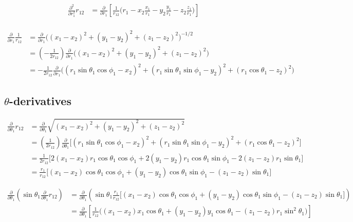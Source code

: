 \begin{align*}
    \frac{\partial^2}{\partial r_1^2} r_{12}
    &= \frac{\partial}{\partial r_1} \left[ \frac{1}{r_{12}} \Big( r_1 - x_2\frac{x_1}{r_1} - y_2\frac{y_1}{r_1} - z_2\frac{z_1}{r_1} \Big) \right] \\
\end{align*}

\begin{align*}
    \frac{\partial}{\partial r_1} \frac{1}{r_{12}}
    &= \frac{\partial}{\partial r_1} \Big( (x_1 - x_2)^2 + (y_1 - y_2)^2 + (z_1 - z_2)^2 \Big)^{-1/2} \\
    &= \left(-\frac{1}{2r_{12}}\right) \frac{\partial}{\partial r_1} \Big( (x_1 - x_2)^2 + (y_1 - y_2)^2 + (z_1 - z_2)^2 \Big) \\
    &= -\frac{1}{2r_{12}} \frac{\partial}{\partial r_1} \Big( (r_1\sin\theta_1\cos\phi_1 - x_2)^2 + (r_1\sin\theta_1\sin\phi_1 - y_2)^2 + (r_1\cos\theta_1 - z_2)^2 \Big)
\end{align*}



\subsection*{$\theta$-derivatives}

\begin{align*}
    \frac{\partial}{\partial \theta_1} r_{12} &= \frac{\partial}{\partial \theta_1} \sqrt{(x_1 - x_2)^2 + (y_1 - y_2)^2 + (z_1 - z_2)^2} \\
    &= \left(\frac{1}{2r_{12}}\right) \frac{\partial}{\partial \theta_1} \Big[ (r_1\sin\theta_1\cos\phi_1 - x_2)^2 + (r_1\sin\theta_1\sin\phi_1 - y_2)^2 + (r_1\cos\theta_1 - z_2)^2 \Big] \\
    &= \frac{1}{2r_{12}} \Big[ 2(x_1 - x_2)r_1\cos\theta_1\cos\phi_1 + 2(y_1 - y_2)r_1\cos\theta_1\sin\phi_1 - 2(z_1-z_2)r_1\sin\theta_1 \Big] \\
    &= \frac{r_1}{r_{12}} \Big[ (x_1 - x_2)\cos\theta_1\cos\phi_1 + (y_1 - y_2)\cos\theta_1\sin\phi_1 - (z_1-z_2)\sin\theta_1 \Big]
\end{align*}

\begin{align*}
    \frac{\partial}{\partial \theta_1} \left(\sin\theta_1\frac{\partial}{\partial \theta_1} r_{12}\right)
    &= \frac{\partial}{\partial \theta_1} \left(\sin\theta_1\frac{r_1}{r_{12}} \Big[ (x_1 - x_2)\cos\theta_1\cos\phi_1 + (y_1 - y_2)\cos\theta_1\sin\phi_1 - (z_1-z_2)\sin\theta_1 \Big] \right) \\
    &= \frac{\partial}{\partial \theta_1} \left[ \frac{1}{r_{12}} \Big( (x_1 - x_2)x_1\cos\theta_1 + (y_1-y_2)y_1\cos\theta_1 - (z_1-z_2)r_1\sin^2\theta_1 \Big) \right]
\end{align*}

